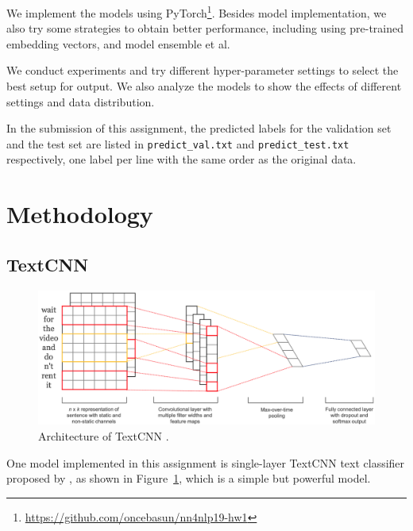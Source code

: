 \documentclass[11pt,letterpaper]{article}
\begin{document}
    We implement the models using PyTorch\footnote{\url{https://github.com/oncebasun/nn4nlp19-hw1}}. 
    Besides model implementation, we also try some strategies to obtain better 
    performance, including using pre-trained embedding vectors, and model 
    ensemble et al. 
    
    We conduct experiments and try different hyper-parameter settings to select 
    the best setup for output. We also analyze the models to show the effects of
    different settings and data distribution.

    In the submission of this assignment, the predicted labels for the 
    validation set and the test set are listed in {\tt predict\_val.txt} and 
    {\tt predict\_test.txt} respectively, one label per line with the same order 
    as the original data.
    
\section{Methodology}
\subsection{TextCNN}
    \begin{figure}[htbp]
        \centering
        \includegraphics[width=\linewidth]{fig/1.png}  
        \caption{Architecture of TextCNN \cite{kim2014convolutional}.} 
        \label{fig:SSCNN}
    \end{figure}

    One model implemented in this assignment is single-layer TextCNN text 
    classifier proposed by , as shown in 
    Figure~\ref{fig:SSCNN}, which is a simple but powerful model. 
\end{document}
